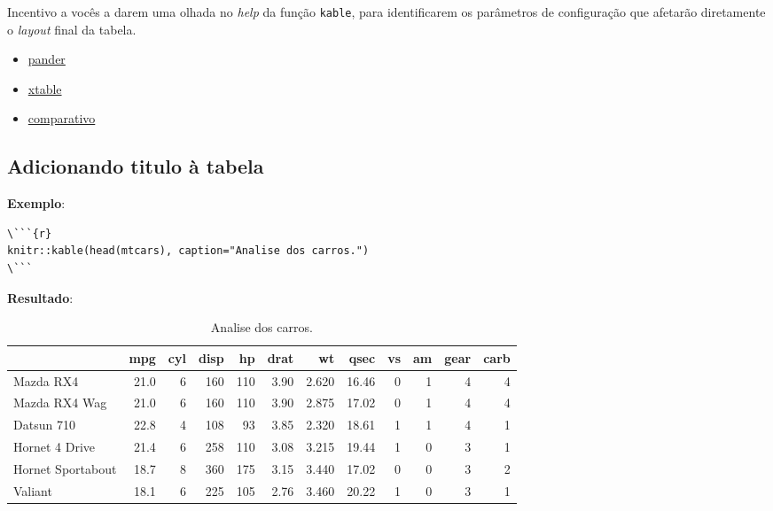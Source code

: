\documentclass[]{book}
\providecommand{\tightlist}{%
  \setlength{\itemsep}{0pt}\setlength{\parskip}{0pt}}
\begin{document}
Incentivo a vocês a darem uma olhada no \emph{help} da função \texttt{kable}, para identificarem os parâmetros de configuração que afetarão diretamente o \emph{layout} final da tabela.

\begin{itemize}
\tightlist
\item
  \href{http://rapporter.github.io/pander/}{pander}\\
\item
  \href{https://cran.r-project.org/web/packages/xtable/index.html}{xtable}\\
\item
  \href{http://rapporter.github.io/pander/}{comparativo}
\end{itemize}

\hypertarget{adicionando-titulo-uxe0-tabela}{%
\subsection{Adicionando titulo à tabela}\label{adicionando-titulo-uxe0-tabela}}

\textbf{Exemplo}:

\begin{verbatim}
\```{r}
knitr::kable(head(mtcars), caption="Analise dos carros.")
\```
\end{verbatim}

\textbf{Resultado}:

\begin{table}

\caption{\label{tab:unnamed-chunk-4}Analise dos carros.}
\centering
\begin{tabular}[t]{l|r|r|r|r|r|r|r|r|r|r|r}
\hline
  & mpg & cyl & disp & hp & drat & wt & qsec & vs & am & gear & carb\\
\hline
Mazda RX4 & 21.0 & 6 & 160 & 110 & 3.90 & 2.620 & 16.46 & 0 & 1 & 4 & 4\\
\hline
Mazda RX4 Wag & 21.0 & 6 & 160 & 110 & 3.90 & 2.875 & 17.02 & 0 & 1 & 4 & 4\\
\hline
Datsun 710 & 22.8 & 4 & 108 & 93 & 3.85 & 2.320 & 18.61 & 1 & 1 & 4 & 1\\
\hline
Hornet 4 Drive & 21.4 & 6 & 258 & 110 & 3.08 & 3.215 & 19.44 & 1 & 0 & 3 & 1\\
\hline
Hornet Sportabout & 18.7 & 8 & 360 & 175 & 3.15 & 3.440 & 17.02 & 0 & 0 & 3 & 2\\
\hline
Valiant & 18.1 & 6 & 225 & 105 & 2.76 & 3.460 & 20.22 & 1 & 0 & 3 & 1\\
\hline
\end{tabular}
\end{table}
\end{document}
